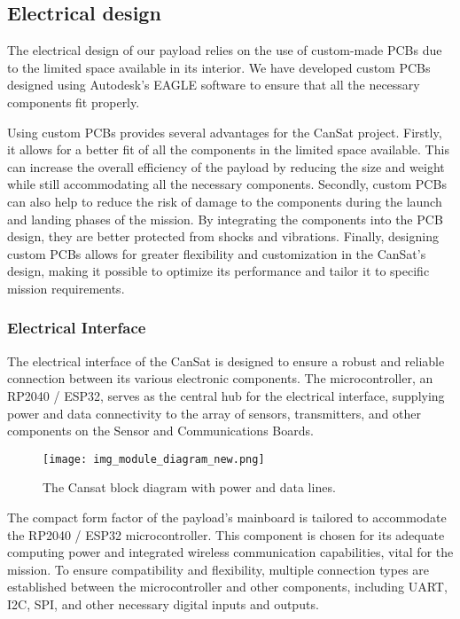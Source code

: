 


\subsection{Electrical design}

The electrical design of our payload relies on the use of custom-made PCBs due to the limited space available in its interior. We have developed custom PCBs designed using Autodesk's EAGLE software to ensure that all the necessary components fit properly. 

Using custom PCBs provides several advantages for the CanSat project. Firstly, it allows for a better fit of all the components in the limited space available. This can increase the overall efficiency of the payload by reducing the size and weight while still accommodating all the necessary components. Secondly, custom PCBs can also help to reduce the risk of damage to the components during the launch and landing phases of the mission. By integrating the components into the PCB design, they are better protected from shocks and vibrations. Finally, designing custom PCBs allows for greater flexibility and customization in the CanSat's design, making it possible to optimize its performance and tailor it to specific mission requirements.

\subsubsection{Electrical Interface}
The electrical interface of the CanSat is designed to ensure a robust and reliable connection between its various electronic components. The microcontroller, an RP2040 / ESP32, serves as the central hub for the electrical interface, supplying power and data connectivity to the array of sensors, transmitters, and other components on the Sensor and Communications Boards.

\begin{figure}[htbp]
\centering
\texttt{[image: img\_module\_diagram\_new.png]}
\caption{\small{The Cansat block diagram with power and data lines.}}
\label{figmodule_diagrame}
\end{figure}

The compact form factor of the payload's mainboard is tailored to accommodate the RP2040 / ESP32 microcontroller. This component is chosen for its adequate computing power and integrated wireless communication capabilities, vital for the mission. To ensure compatibility and flexibility, multiple connection types are established between the microcontroller and other components, including UART, I2C, SPI, and other necessary digital inputs and outputs.

